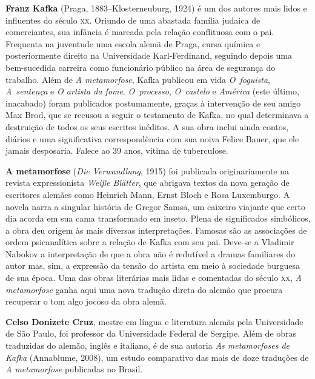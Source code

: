 \textbf{Franz Kafka} (Praga, 1883--Klosterneuburg, 1924) é um dos autores mais lidos 
e influentes do século \textsc{xx}. Oriundo de uma abastada família judaica de
comerciantes, sua infância é marcada pela relação conflituosa com o pai.
Frequenta na juventude uma escola alemã de Praga, cursa química e
posteriormente direito na Universidade Karl{}-Ferdinand, seguindo depois 
uma bem{}-sucedida carreira como funcionário público na área de segurança do trabalho. 
Além de \textit{A metamorfose}, Kafka publicou em vida \textit{O~foguista}, \textit{A~sentença}
e \textit{O artista da fome}. \textit{O~processo}, \textit{O~castelo} e \textit{América} 
(este último, inacabado) foram publicados postumamente, graças à intervenção de 
seu amigo Max Brod, que se recusou a seguir o testamento de Kafka, no qual 
determinava a destruição de todos os seus escritos inéditos. A sua obra inclui
ainda contos, diários e uma significativa correspondência com sua noiva Felice
Bauer, que ele jamais desposaria. Falece ao 39 anos, vítima de tuberculose.

\textbf{A metamorfose} (\textit{Die Verwandlung}, 1915) foi publicada
originariamente na revista expressionista \textit{Weiße Blätter}, que abrigava
textos da nova geração de escritores alemães como Heinrich Mann, Ernst Bloch e
Rosa Luxemburgo. A novela narra a singular história de Gregor Samsa, um caixeiro
viajante que certo dia acorda em sua cama transformado em inseto. Plena de
significados simbólicos, a obra deu origem às mais diversas interpretações.
Famosas são as associações de ordem psicanalítica sobre a relação de Kafka 
com seu pai. Deve{}-se a Vladimir Nabokov a interpretação de que a obra não é
redutível a dramas familiares do autor mas, sim, a expressão da tensão do artista
em meio à sociedade burguesa de sua época. Uma das obras literárias mais lidas e comentadas
do século \textsc{xx}, \textit{A metamorfose} ganha aqui uma nova tradução direta do
alemão que procura recuperar o tom algo jocoso da obra alemã.
        
\textbf{Celso Donizete Cruz}, mestre em língua e literatura alemãs pela Universidade de São Paulo, foi professor da Universidade Federal de Sergipe. Além de obras traduzidas do alemão, inglês e italiano, é de sua autoria \textit{As metamorfoses de Kafka} (Annablume, 2008), um estudo comparativo das mais de doze traduções de \textit{A metamorfose} publicadas no Brasil.



